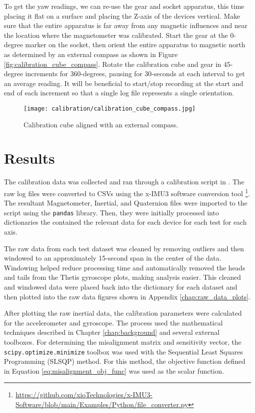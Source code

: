 To get the yaw readings, we can re-use the gear and socket apparatus, this time placing it flat on a surface and placing the Z-axis of the devices vertical.
Make sure that the entire apparatus is far away from any magnetic influences and near the location where the magnetometer was calibrated.
Start the gear at the 0-degree marker on the socket, then orient the entire apparatus to magnetic north as determined by an external compass as shown in Figure \ref{fig:calibration_cube_compass}.
Rotate the calibration cube and gear in 45-degree increments for 360-degrees, pausing for 30-seconds at each interval to get an average reading.
It will be beneficial to start/stop recording at the start and end of each increment so that a single log file represents a single orientation.

\begin{figure}[h!]
    \centering
    \texttt{[image: calibration/calibration\_cube\_compass.jpg]}
    \caption{Calibration cube aligned with an external compass.}
\end{figure}

\section{Results} 
The calibration data was collected and ran through a calibration script in \cite{Thetis-Scripts}.
The raw log files were converted to CSVs using the x-IMU3 software conversion tool \footnote{\url{https://github.com/xioTechnologies/x-IMU3-Software/blob/main/Examples/Python/file_converter.py}}.
The resultant Magnetometer, Inertial, and Quaternion files were imported to the script using the \lstinline[style=customInline]|pandas| library.
Then, they were initially processed into dictionaries the contained the relevant data for each device for each test for each axis.

The raw data from each test dataset was cleaned by removing outliers and then windowed to an approximately 15-second span in the center of the data.
Windowing helped reduce processing time and automatically removed the heads and tails from the Thetis gyroscope plots, making analysis easier.
This cleaned and windowed data were placed back into the dictionary for each dataset and then plotted into the raw data figures shown in Appendix \ref{chap:raw_data_plots}.

After plotting the raw inertial data, the calibration parameters were calculated for the accelerometer and gyroscope.
The process used the mathematical techniques described in Chapter \ref{chap:background} and several external toolboxes.
For determining the misalignment matrix and sensitivity vector, the \lstinline[style=customInline]|scipy.optimize.minimize| toolbox was used with the Sequential Least Squares Programming (SLSQP) method.
For this method, the objective function defined in Equation \ref{eq:misalignment_obj_func} was used as the scalar function.

